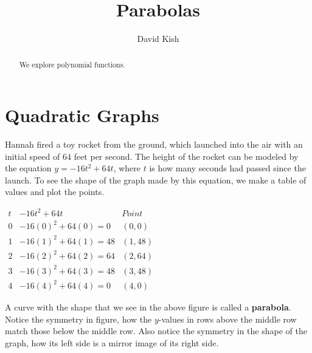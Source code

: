 \documentclass{ximera}
\author{David Kish}
\title{Parabolas}
\begin{document}
\begin{abstract}
We explore polynomial functions.
\end{abstract}
\maketitle

\section{Quadratic Graphs}
\begin{example}
      Hannah fired a toy rocket from the ground,
      which launched into the air with an initial speed of $64$ feet per second.
      The height of the rocket can be modeled by the equation $y=-16t^2+64t$,
      where $t$ is how many seconds had passed since the launch.
      To see the shape of the graph made by this equation,
      we make a table of values and plot the points.\\
\begin{center}
        $
\begin{array}{ccc}
                t & -16t^2+64t & Point\\
\hline
                 0 &  -16(0)^2+64(0) =0 & (0,0) \\
        1& -16(1)^2+64(1) =48&(1,48) \\
          2 & -16(2)^2+64(2) =64 &(2,64)\\
3&-16(3)^2+64(3)=48 &(3,48)\\
            4 & -16(4)^2+64(4)=0  &(4,0)
    \end{array}
$
\end{center}
\begin{image}
\end{image}
\end{example}
 A curve with the shape that we see in the above figure
      is called a \textbf{parabola}.
      Notice the symmetry in figure,
      how the $y$-values in rows above the middle row match those below the middle row.
      Also notice the symmetry in the shape of the graph,
      how its left side is a mirror image of its right side.
\end{document}
